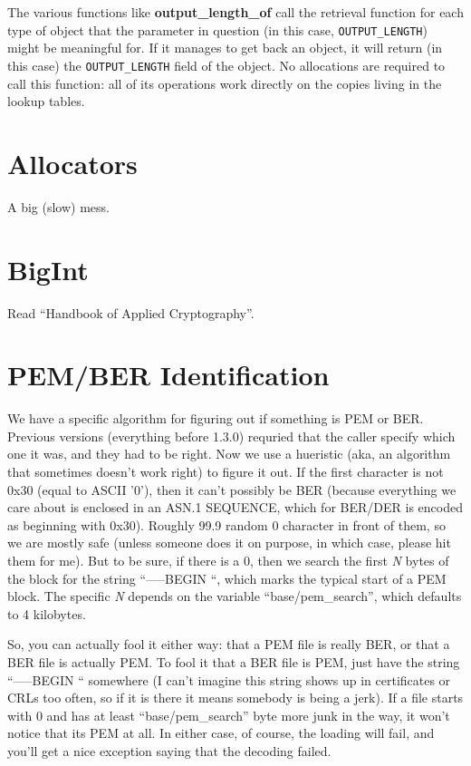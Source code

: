 \documentclass{article}
\newcommand{\function}[1]{\textbf{#1}}
\begin{document}
The various functions like \function{output\_length\_of} call the
retrieval function for each type of object that the parameter in
question (in this case, \texttt{OUTPUT\_LENGTH}) might be meaningful
for. If it manages to get back an object, it will return (in this
case) the \texttt{OUTPUT\_LENGTH} field of the object. No allocations
are required to call this function: all of its operations work
directly on the copies living in the lookup tables.

\section{Allocators}

A big (slow) mess.

\section{BigInt}

Read ``Handbook of Applied Cryptography''.

\section{PEM/BER Identification}

We have a specific algorithm for figuring out if something is PEM or
BER. Previous versions (everything before 1.3.0) requried that the
caller specify which one it was, and they had to be right. Now we use
a hueristic (aka, an algorithm that sometimes doesn't work right) to
figure it out. If the first character is not 0x30 (equal to ASCII
'0'), then it can't possibly be BER (because everything we care about
is enclosed in an ASN.1 SEQUENCE, which for BER/DER is encoded as
beginning with 0x30). Roughly 99.9%
random 0 character in front of them, so we are mostly safe (unless
someone does it on purpose, in which case, please hit them for me).
But to be sure, if there is a 0, then we search the first \emph{N}
bytes of the block for the string ``-----BEGIN ``, which marks the
typical start of a PEM block. The specific \emph{N} depends on the
variable ``base/pem\_search'', which defaults to 4 kilobytes.

So, you can actually fool it either way: that a PEM file is really
BER, or that a BER file is actually PEM. To fool it that a BER file is
PEM, just have the string ``-----BEGIN `` somewhere (I can't imagine
this string shows up in certificates or CRLs too often, so if it is
there it means somebody is being a jerk). If a file starts with 0 and
has at least ``base/pem\_search'' byte more junk in the way, it won't
notice that its PEM at all. In either case, of course, the loading
will fail, and you'll get a nice exception saying that the decoding
failed.
\end{document}
